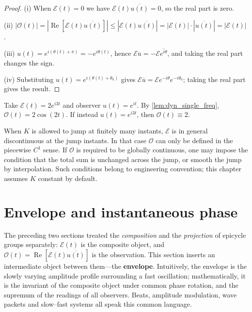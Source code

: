 \begin{proof}
(i) When $\mathcal E(t)=0$ we have $\mathcal E(t)\overline{u(t)}=0$, so the real part is zero.

(ii) $|\mathcal O(t)|=|\operatorname{Re}[\mathcal E(t)\overline{u(t)}]|\le|\mathcal E(t)\overline{u(t)}|=|\mathcal E(t)|\cdot|\overline{u(t)}|=|\mathcal E(t)|$.

(iii) $u(t)=e^{i(\theta(t)+\pi)}=-e^{i\theta(t)}$, hence $\mathcal E\overline u=-\mathcal E\overline{e^{i\theta}}$, and taking the real part changes the sign.

(iv) Substituting $u(t)=e^{i(\theta(t)+\theta_0)}$ gives $\mathcal E\overline u=\mathcal E e^{-i\theta}e^{-i\theta_0}$; taking the real part gives the result.
\end{proof}

\begin{example}\label{ex:dyn_single_freq_example}
Take $\mathcal E(t)=2e^{i3t}$ and observer $u(t)=e^{it}$. By \cref{lem:dyn_single_freq}, $\mathcal O(t)=2\cos(2t)$. If instead $u(t)=e^{i3t}$, then $\mathcal O(t)\equiv 2$.
\end{example}

\begin{remark}\label{rem:dyn_K_jump}
When $K$ is allowed to jump at finitely many instants, $\mathcal E$ is in general discontinuous at the jump instants. In that case $\mathcal O$ can only be defined in the piecewise $C^1$ sense. If $\mathcal O$ is required to be globally continuous, one may impose the condition that the total sum is unchanged across the jump, or smooth the jump by interpolation. Such conditions belong to engineering convention; this chapter assumes $K$ constant by default.
\end{remark}

\section{Envelope and instantaneous phase}
\label{sec:dyn_envelope}

The preceding two sections treated the \emph{composition} and the \emph{projection} of epicycle groups separately: $\mathcal E(t)$ is the composite object, and $\mathcal O(t)=\operatorname{Re}[\mathcal E(t)\overline{u(t)}]$ is the observation. This section inserts an intermediate object between them---the \textbf{envelope}. Intuitively, the envelope is the slowly varying amplitude profile surrounding a fast oscillation; mathematically, it is the invariant of the composite object under common phase rotation, and the supremum of the readings of all observers. Beats, amplitude modulation, wave packets and slow--fast systems all speak this common language.

